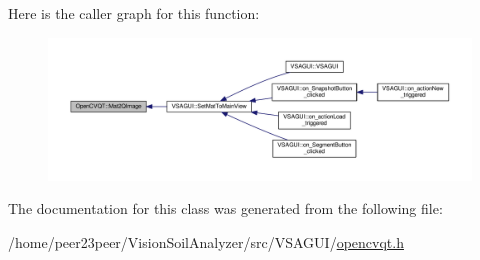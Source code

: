 Here is the caller graph for this function\+:\nopagebreak
\begin{figure}[H]
\begin{center}
\leavevmode
\includegraphics[width=350pt]{class_open_c_v_q_t_aed2deb7932b122f110cb651747d6d81b_icgraph}
\end{center}
\end{figure}




The documentation for this class was generated from the following file\+:\begin{DoxyCompactItemize}
\item 
/home/peer23peer/\+Vision\+Soil\+Analyzer/src/\+V\+S\+A\+G\+U\+I/\hyperlink{opencvqt_8h}{opencvqt.\+h}\end{DoxyCompactItemize}
